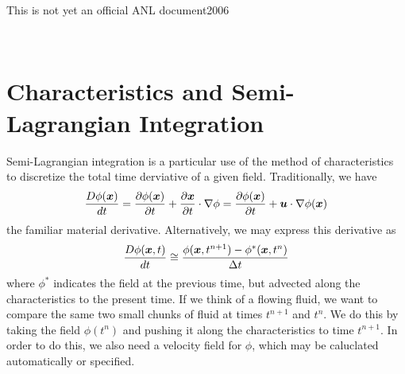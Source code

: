 \documentclass[twoside,12pt]{../sty/report_petsc}
\newcommand{\sindex}[1]{\index{#1}}
\newcommand{\x}{\mbox{\boldmath \(x\)}}
\newcommand{\vu}{\mbox{\boldmath \(u\)}}
\begin{document}
{\Large This is not yet an official ANL document}{2006}

\newpage

\hbox{ }

\vspace{1in}
\date{\today}

\newpage

\chapter{Characteristics and Semi-Lagrangian Integration} 
\label{chapter_characteristics}
\sindex{characteristics}

    Semi-Lagrangian integration is a particular use of the method of characteristics to discretize the total time
derviative of a given field. Traditionally, we have
\begin{equation}
  {D\phi(\x) \over dt} = {\partial\phi(\x) \over \partial t} + {\partial\x \over \partial t} \cdot \nabla\phi
  = {\partial\phi(\x) \over \partial t} + \vu \cdot \nabla\phi(\x)
\end{equation}
the familiar material derivative. Alternatively, we may express this derivative as
\begin{equation}
  {D\phi(\x,t) \over dt} \cong {\phi(\x,t^{n+1}) - \phi^*(\x,t^n)\over \Delta t}
\end{equation}
where $\phi^*$ indicates the field at the previous time, but advected along the characteristics to the present time. If
we think of a flowing fluid, we want to compare the same two small chunks of fluid at times $t^{n+1}$ and $t^n$. We do
this by taking the field $\phi(t^n)$ and pushing it along the characteristics to time $t^{n+1}$. In order to do this, we
also need a velocity field for $\phi$, which may be caluclated automatically or specified.
\end{document}
